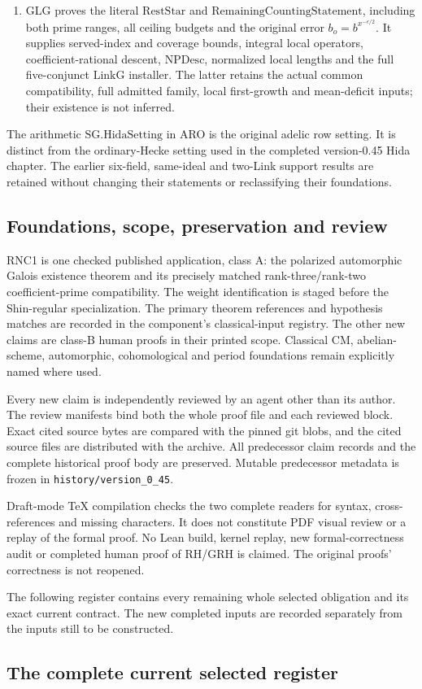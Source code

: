 \begin{enumerate}
\item GLG proves the literal \(\mathrm{RestStar}\) and
\(\mathrm{RemainingCountingStatement}\), including both prime
ranges, all ceiling budgets and the original error
\(b_o=b^{x^{-\epsilon/2}}\). It supplies served-index and coverage
bounds, integral local operators, coefficient-rational descent,
\(\mathrm{NPDesc}\), normalized local lengths and the full
five-conjunct \(\mathrm{LinkG}\) installer. The latter retains the
actual common compatibility, full admitted family, local first-growth
and mean-deficit inputs; their existence is not inferred.
\end{enumerate}

The arithmetic \(\mathrm{SG.HidaSetting}\) in ARO is the original
adelic row setting. It is distinct from the ordinary-Hecke setting
used in the completed version-0.45 Hida chapter. The earlier six-field,
same-ideal and two-Link support results are retained without changing
their statements or reclassifying their foundations.

\subsection{Foundations, scope, preservation and review}

RNC1 is one checked published application, class A: the polarized
automorphic Galois existence theorem and its precisely matched
rank-three/rank-two coefficient-prime compatibility. The weight
identification is staged before the Shin-regular specialization.
The primary theorem references and hypothesis matches are recorded
in the component's classical-input registry. The other new claims
are class-B human proofs in their printed scope. Classical CM,
abelian-scheme, automorphic, cohomological and period foundations
remain explicitly named where used.

Every new claim is independently reviewed by an agent other than its
author. The review manifests bind both the whole proof file and each
reviewed block. Exact cited source bytes are compared with the pinned
git blobs, and the cited source files are distributed with the archive.
All predecessor claim records and the complete historical proof body
are preserved. Mutable predecessor metadata is frozen in
\texttt{history/version\_0\_45}.

Draft-mode TeX compilation checks the two complete readers for syntax,
cross-references and missing characters. It does not constitute PDF
visual review or a replay of the formal proof. No Lean build, kernel
replay, new formal-correctness audit or completed human proof of RH/GRH
is claimed. The original proofs' correctness is not reopened.

The following register contains every remaining whole selected
obligation and its exact current contract. The new completed inputs
are recorded separately from the inputs still to be constructed.

\subsection{The complete current selected register}

